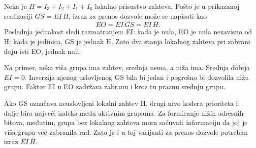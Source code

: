 
Neka je \(H=I_3+I_2+I_1+I_0\) lokalno prisustvo zahteva. Pošto je u prikazanoj realizaciji \(GS=EI\,H\), izraz za prenos dozvole može se napisati kao
\[
 EO=EI\,\overline{GS}=EI\,\overline H.
\]
Poslednja jednakost sledi razmatranjem EI: kada je nula, EO je nula nezavisno od H; kada je jedinica, GS je jednak H. Zato dva stanja lokalnog zahteva pri zabrani daju isti EO, jednak nuli.

Na primer, neka viša grupa ima zahtev, srednja nema, a niža ima. Srednja dobija \(EI=0\). Inverzija njenog uslovljenog GS bila bi jedan i pogrešno bi dozvolila nižu grupu. Faktor EI u EO zadržava zabranu i kroz tu praznu srednju grupu.

Ako GS označava neuslovljeni lokalni zahtev H, drugi nivo kodera prioriteta i dalje bira najveći indeks među aktivnim grupama. Za formiranje nižih adresnih bitova, međutim, grupa bez lokalnog zahteva mora sačuvati informaciju da joj je viša grupa već zabranila rad. Zato je i u toj varijanti za prenos dozvole potreban izraz \(EI\,\overline H\).
